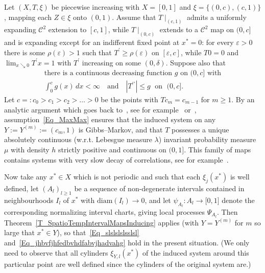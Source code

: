 \documentclass[AHL,Unicode,longabstracts]{cedram}
\newcommand{\clC}{\mathcal{C}}
\newcommand{\diam}{\mathrm{diam}}
\begin{document}
\begin{exam}
Let $(X,T,\xi)$ be piecewise increasing with $X=[0,1]$ and $\xi=\{(0,c),(c,1)\}$, mapping each $Z\in\xi$ onto $(0,1)$. Assume that $T\mid_{(c,1)}$ admits a uniformly expanding $\clC^{2}$ extension to $[c,1]$, while $T\mid_{(0,c)}$ extends to a $\clC^{2}$ map on $(0,c]$ and is expanding except for an indifferent fixed point at $x^{\ast}=0$: for every $\varepsilon>0$ there is some $\rho(\varepsilon)>1$ such that $T^{\prime}\geq\rho(\varepsilon)$ on $[\varepsilon,c]$, while $T0=0$ and $\lim\nolimits_{x\searrow0}T^{\prime}x=1$ with $T^{\prime}$ increasing on some $(0,\delta)$. Suppose also that
\begin{equation}\label{Eq_MaxMax}
\begin{gathered}
\text{there is a continuous decreasing function }g\text{ on }(0,c]\text{ with}\\
\int_{0}^{c}g(x)\,dx<\infty\quad \text{and} \quad\left\vert T^{\prime\prime }\right\vert \leq g\;\text{ on }\;(0,c]. 
\end{gathered}
\end{equation}
Let $c=:c_{0}>c_{1}>c_{2}>\ldots>0$ be the points with $Tc_{m}=c_{m-1}$ for $m\geq1$. By an analytic argument which goes back to~\cite{T1}, see for example~\cite[\S~3]{Z3} or~\cite[\S~4]{T3}, assumption~\eqref{Eq_MaxMax} ensures that the induced system on any $Y:=Y^{(m)}:=(c_{m},1)$ is Gibbs--Markov, and that $T$ possesses a unique absolutely continuous (w.r.t. Lebesgue measure $\lambda$) invariant probability measure $\mu$ with density $h$ strictly positive and continuous on $(0,1]$. This family of maps contains systems with very slow decay of correlations, see for example~\cite{Holland}.

Now take any $x^{\ast}\in X$ which is not periodic and such that each $\xi _{j}(x^{\ast})$ is well defined, let $(A_{l})_{l\geq1}$ be a sequence of non-degenerate intervals contained in neighbourhoods $I_{l}$ of $x^{\ast}$ with $\diam(I_{l})\rightarrow0$, and let $\psi_{A_{l}}:A_{l}
\rightarrow\lbrack0,1]$ denote the corresponding normalizing interval charts, giving local processes $\Psi_{A_{l}}$. Then Theorem~\ref{T_SpatioTempIntervalMapsInducing} applies (with $Y=Y^{(m)}$ for $m$ so large that $x^{\ast}\in Y$), so that~\eqref{Eq_slslslslsslsl} and~\eqref{Eq_jhbvfjhfedbvhdfabvjhadvahg} hold in the present situation. (We only need to observe that all cylinders $\xi_{Y,l}(x^{\ast})$ of the induced system around this particular point are well defined since the cylinders of the original system are.)
\end{exam}
\end{document}

